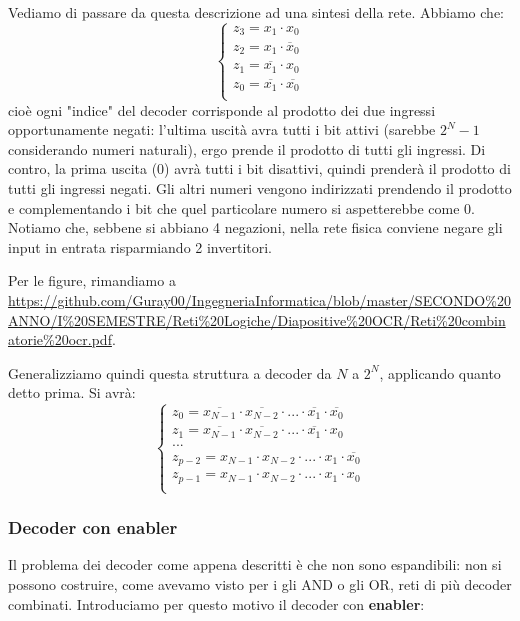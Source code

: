 \documentclass[a4paper,11pt]{article}
\begin{document}
Vediamo di passare da questa descrizione ad una sintesi della rete. Abbiamo che:
\[
	\begin{cases}
			
z_3 = x_1 \cdot x_0 \\ 
z_2 = x_1 \cdot \overline{x}_0 \\ 
z_1 = \overline{x_1} \cdot x_0 \\ 
z_0 = \overline{x_1} \cdot \overline{x_0} \\ 
	\end{cases}
\]
cioè ogni "indice" del decoder corrisponde al prodotto dei due ingressi opportunamente negati: l'ultima uscità avra tutti i bit attivi (sarebbe $2^N -1$ considerando numeri naturali), ergo prende il prodotto di tutti gli ingressi.
Di contro, la prima uscita ($0$) avrà tutti i bit disattivi, quindi prenderà il prodotto di tutti gli ingressi negati.
Gli altri numeri vengono indirizzati prendendo il prodotto e complementando i bit che quel particolare numero si aspetterebbe come $0$.
Notiamo che, sebbene si abbiano 4 negazioni, nella rete fisica conviene negare gli input in entrata risparmiando 2 invertitori.

Per le figure, rimandiamo a \url{https://github.com/Guray00/IngegneriaInformatica/blob/master/SECONDO%20ANNO/I%20SEMESTRE/Reti%20Logiche/Diapositive%20OCR/Reti%20combinatorie%20ocr.pdf}.

Generalizziamo quindi questa struttura a decoder da $N$ a $2^N$, applicando quanto detto prima. Si avrà:
\[
	\begin{cases}
		z_0 = \overline{x_{N-1}} \cdot \overline{x_{N-2}} \cdot ... \cdot \overline{x_1} \cdot \overline{x_0}	\\
		z_1 = \overline{x_{N-1}} \cdot \overline{x_{N-2}} \cdot ... \cdot \overline{x_1} \cdot x_0	\\
		... \\ 
		z_{p-2} = x_{N-1} \cdot x_{N-2} \cdot ... \cdot x_1 \cdot \overline{x_0} \\
		z_{p-1} = x_{N-1} \cdot x_{N-2} \cdot ... \cdot x_1 \cdot x_0	\\
	\end{cases}
\]

\subsubsection{Decoder con enabler}
Il problema dei decoder come appena descritti è che non sono espandibili: non si possono costruire, come avevamo visto per i gli AND o gli OR, reti di più decoder combinati.
Introduciamo per questo motivo il decoder con \textbf{enabler}:
\end{document}

